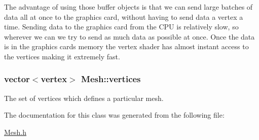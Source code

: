 The advantage of using those buffer objects is that we can send large batches of data all at once to the graphics card, without having to send data a vertex a time. Sending data to the graphics card from the C\+PU is relatively slow, so wherever we can we try to send as much data as possible at once. Once the data is in the graphics card\textquotesingle{}s memory the vertex shader has almost instant access to the vertices making it extremely fast. 
\subsubsection[{\texorpdfstring{vertices}{vertices}}]{\setlength{\rightskip}{0pt plus 5cm}vector$<${\bf vertex}$>$ Mesh\+::vertices}\hypertarget{classMesh_a57fc8cde81bbaa1317983a29b5647e26}{}\label{classMesh_a57fc8cde81bbaa1317983a29b5647e26}
The set of vertices which defines a particular mesh. 

The documentation for this class was generated from the following file\+:\begin{DoxyCompactItemize}
\item 
\hyperlink{Mesh_8h}{Mesh.\+h}\end{DoxyCompactItemize}
